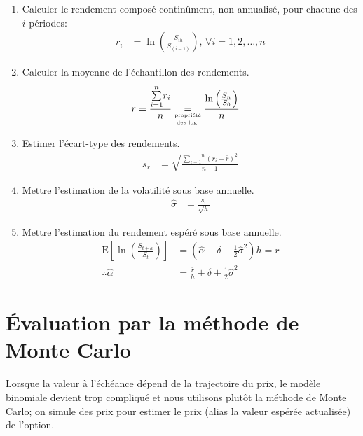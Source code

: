 \documentclass[10pt, french]{article}
\begin{document}
\begin{multicols*}{2}
\begin{definitionNOHFILL}
\begin{enumerate}
	\item	Calculer le rendement composé continûment, non annualisé, pour chacune des $i$ périodes:
		\begin{align*}
		r_{i}
		&=	\ln\left(\frac{S_{ih}}{S_{(i - 1)}}\right), \, \forall i = 1, 2, \dots, n
		\end{align*}
	\item	Calculer la moyenne de l'échantillon des rendements.
		\begin{align*}
		\bar{r}
		&=	\frac{\overset{n}{\underset{i = 1}{\sum}} r_{i}}{n}	
		\underset{\tiny{\shortstack{propriété\\ des log.}}}{=}	\frac{\ln\left(\frac{S_{n}}{S_{0}}\right)}{n}
		\end{align*}
	\item	Estimer l'écart-type des rendements.
		\begin{align*}
		s_{r}
		&=	\sqrt{\frac{\overset{n}{\underset{i = 1}{\sum}} (r_{i} - \bar{r})^{2}}{n - 1}}
		\end{align*}
	\item	Mettre l'estimation de la volatilité sous base annuelle.
		\begin{align*}
		\hat{\sigma}
		&=	\frac{s_{r}}{\sqrt{h}}
		\end{align*}
	\item	Mettre l'estimation du rendement espéré sous base annuelle.
		\begin{align*}
		\text{E}\left[\ln\left(\frac{S_{t + h}}{S_{t}}\right)\right]
		&=
		\left(\hat{\alpha} - \delta - \frac{1}{2} \hat{\sigma}^{2}\right)h	
		=	\bar{r}	\\
		\therefore \hat{\alpha}	&=	\frac{\bar{r}}{h} + \delta + \frac{1}{2} \hat{\sigma}^{2}
		\end{align*}
\end{enumerate}
\end{definitionNOHFILL}

\pagebreak
\section{Évaluation par la méthode de Monte Carlo}
Lorsque la valeur à l'échéance dépend de la trajectoire du prix, le modèle binomiale devient trop compliqué et nous utilisons plutôt la méthode de Monte Carlo; on simule des prix pour estimer le prix (alias la valeur espérée actualisée) de l'option.


\end{multicols*}
\end{document}

